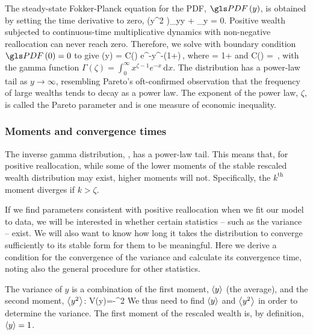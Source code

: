 The steady-state Fokker-Planck equation for the PDF, $\PDF\left(y\right)$, is obtained by setting the time derivative to zero,
\be
{}\left(y^2 \PDF\right)_{yy} + \tau{}_y = 0.
\ee
Positive wealth subjected to continuous-time multiplicative dynamics with non-negative reallocation can never reach zero. Therefore, we solve  with boundary condition $\PDF\left(0\right)=0$ to give
\be
\PDF\left(y\right) = C\left(\zeta\right) e^{-}y^{-\left(1+\zeta\right)}\,,
\ee
where 
\be
\zeta = 1+
\ee
and
\be
C\left(\zeta\right) = \frac{\left(\zeta -1\right)^\zeta}{\Gamma \left(\zeta \right)}\,,
\ee
with the gamma function $\Gamma\left(\zeta\right) = \int_0^\infty x^{\zeta-1} e^{-x}\,\mathrm{d}x$. The distribution has a power-law tail as $y\to\infty$, resembling Pareto's oft-confirmed observation that the frequency of large wealths tends to decay as a power law. The exponent of the power law, $\zeta$, is called the Pareto parameter and is one measure of economic inequality.


\subsubsection{Moments and convergence times}
\label{RGBM_moments}
The inverse gamma distribution, , has a power-law tail. This means that, for positive reallocation, while some of the lower moments of the stable rescaled wealth distribution may exist, higher moments will not. Specifically, the $k^\text{th}$ moment diverges if $k>\zeta$. 

If we find parameters consistent with positive reallocation when we fit our model to data, we will be interested in whether certain statistics -- such as the variance -- exist. We will also want to know how long it takes the distribution to converge sufficiently to its stable form for them to be meaningful. Here we derive a condition for the convergence of the variance and calculate its convergence time, noting also the general procedure for other statistics.

The variance of $y$ is a combination of the first moment, $\left\langle y \right\rangle$ (the average), and the second moment, $\left\langle y^2 \right\rangle$:
\be
V\left(y\right)=-^2
\ee
We thus need to find $\left\langle y \right\rangle$ and $\left\langle y^2 \right\rangle$ in order to determine the variance. The first moment of the rescaled wealth is, by definition, $\left\langle y \right\rangle=1$. 

